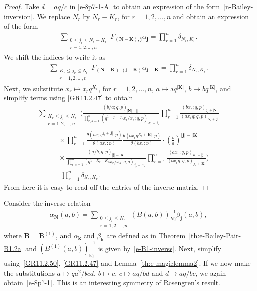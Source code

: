 \documentclass[pdftex]{sigma}
\numberwithin{equation}{section}
\newcommand{\sumN}{{\left| \boldsymbol{N} \right|}}
\newcommand\sumK{{\left| \boldsymbol{K} \right|}}
\newcommand\sumj{{\left| \boldsymbol {j} \right|}}
\newcommand{\B}{{ \mathbf B}}
\newcommand{\N}{{ \boldsymbol N}}
\newcommand{\K}{{ \boldsymbol K}}
\renewcommand{\k}{{ \boldsymbol{k}}}
\renewcommand{\j}{{ \boldsymbol{j}}}
\newcommand{\multsum}[3]{{\sum\limits_{\substack{{0\le #1_#3 \le #2_#3} \\
{#3 =1,2,\dots, n}}}}}
\newcommand{\sqprod}[1]{\prod\limits_{r, s =1}^{#1}} %
\newcommand{\smallprod}[1]{\prod\limits_{r =1}^{#1}} %
\newcommand{\xover}[1]{#1_{r}/#1_{s}}
\newcommand{\ellipticqrfac}[2]{{\left({#1}; q, p\right)_{#2}}} %
\newcommand{\elliptictheta}[1]{\theta \left({#1} ; p\right) }
\begin{document}
\begin{proof} Take $d=aq/c$ in \eqref{e-8p7-1-A} to obtain an expression of the form~\eqref{n-Bailey-inversion}. We replace $N_r$ by $N_r-K_r$, for $r=1, 2, \dots, n$ and obtain an expression of the form
 \begin{gather*}%
 \multsum{j}{N_r-K}{r} F_{(\N-\K),\j} \alpha_\j=\smallprod n \delta_{N_r, K_r} .
\end{gather*}
We shift the indices to write it as
\begin{gather*}%
\sum\limits_{\substack{{K_r\le j_r \le N_r} \\
{r =1,2,\dots, n}}} F_{(\N-\K),(\j-\K)} \alpha_{\j-\K} =\smallprod n \delta_{N_r, K_r} .
\end{gather*}
Next, we substitute $x_r\mapsto x_rq^{K_r}$, for $r=1, 2, \dots, n$, $a\mapsto aq^{\sumK}$, $b\mapsto bq^{\sumK}$, and simplify terms using \eqref{GR11.2.47} to obtain
\begin{gather*}
\sum\limits_{\substack{{K_r\le j_r \le N_r} \\
{r =1,2,\dots, n}}} \Bigg( \frac{\ellipticqrfac{b/a}{\sumN-\sumj}}
{ \sqprod n \ellipticqrfac{q^{1+j_r-j_s}\xover x }{N_r-j_r}}
 \smallprod n \frac{\ellipticqrfac{bx_r}{j_r+\sumN}}{\ellipticqrfac{ax_rq}{N_r+\sumj}} \\
\qquad\quad{} \times
\smallprod n \frac{\elliptictheta{ax_rq^{j_r+\sumj}}}{\elliptictheta{ax_r}}
\frac{\elliptictheta{bx_rq^{K_r+\sumK}}}{\elliptictheta{bx_r}}
\cdot \left( \frac{b}{a}\right)^{\sumj-\sumK}\\
\qquad\quad{} \times
\frac{\ellipticqrfac{a/b}{\sumj-\sumK}}
{ \sqprod n \ellipticqrfac{q^{1+K_r-K_s}\xover x }{j_r-K_r}}
 \smallprod n \frac{\ellipticqrfac{ax_r}{K_r+\sumj}}{\ellipticqrfac{bx_rq}{j_r+\sumK}} \Bigg)\\
\qquad{} = \smallprod n \delta_{N_r, K_r}.
\end{gather*}
From here it is easy to read off the entries of the inverse matrix.
\end{proof}

Consider the inverse relation
\begin{gather} \label{multivariable-inverse-relation}
\alpha_\N(a,b) = \multsum{j}{N}{r} (B(a,b))^{-1}_{\N\j} \beta_{\j} (a,b),
\end{gather}
where $\B=\B^{(1)}$, and $\alpha_\k$ and $\beta_\k$ are defined as in Theorem~\ref{th:e-Bailey-Pair-B1.2a} and $(B^{(1)}(a,b))^{-1}_{\k\j} $ is given by~\eqref{e-B1-inverse}. Next, simplify using~\eqref{GR11.2.50}, \eqref{GR11.2.47} and Lemma~\ref{th:e-magiclemma2}. If we now make the substitutions $a\mapsto qa^2/bcd$, $b\mapsto c$, $c\mapsto aq/bd$ and $d\mapsto aq/bc$, we again obtain~\eqref{e-8p7-1}. This is an interesting symmetry of Rosengren's result.
\end{document}
